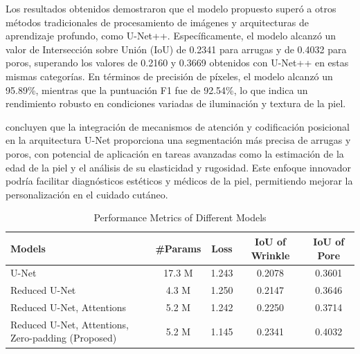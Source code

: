 Los resultados obtenidos demostraron que el modelo propuesto superó a otros métodos tradicionales de procesamiento de imágenes y arquitecturas de aprendizaje profundo, como U-Net++. Específicamente, el modelo alcanzó un valor de Intersección sobre Unión (IoU) de 0.2341 para arrugas y de 0.4032 para poros, superando los valores de 0.2160 y 0.3669 obtenidos con U-Net++ en estas mismas categorías. En términos de precisión de píxeles, el modelo alcanzó un 95.89\%, mientras que la puntuación F1 fue de 92.54\%, lo que indica un rendimiento robusto en condiciones variadas de iluminación y textura de la piel.

\cite{yoon2023} concluyen que la integración de mecanismos de atención y codificación posicional en la arquitectura U-Net proporciona una segmentación más precisa de arrugas y poros, con potencial de aplicación en tareas avanzadas como la estimación de la edad de la piel y el análisis de su elasticidad y rugosidad. Este enfoque innovador podría facilitar diagnósticos estéticos y médicos de la piel, permitiendo mejorar la personalización en el cuidado cutáneo.


\begin{table}[h!]
    \centering
    \caption{Performance Metrics of Different Models}
    \renewcommand{\arraystretch}{1.2} %
    \setlength{\tabcolsep}{5pt} %
    \begin{tabularx}{\textwidth}{@{}X c c c c@{}}
        \toprule
        \textbf{Models} & \textbf{\#Params} & \textbf{Loss} & \textbf{IoU of Wrinkle} & \textbf{IoU of Pore} \\ \midrule
        U-Net & 17.3 M & 1.243 & 0.2078 & 0.3601 \\
        Reduced U-Net & 4.3 M & 1.250 & 0.2147 & 0.3646 \\
        Reduced U-Net, Attentions & 5.2 M & 1.242 & 0.2250 & 0.3714 \\
        Reduced U-Net, Attentions, Zero-padding (Proposed) & 5.2 M & 1.145 & 0.2341 & 0.4032 \\ 
        \bottomrule
    \end{tabularx}
    \label{tab:models_performance}
\end{table}




